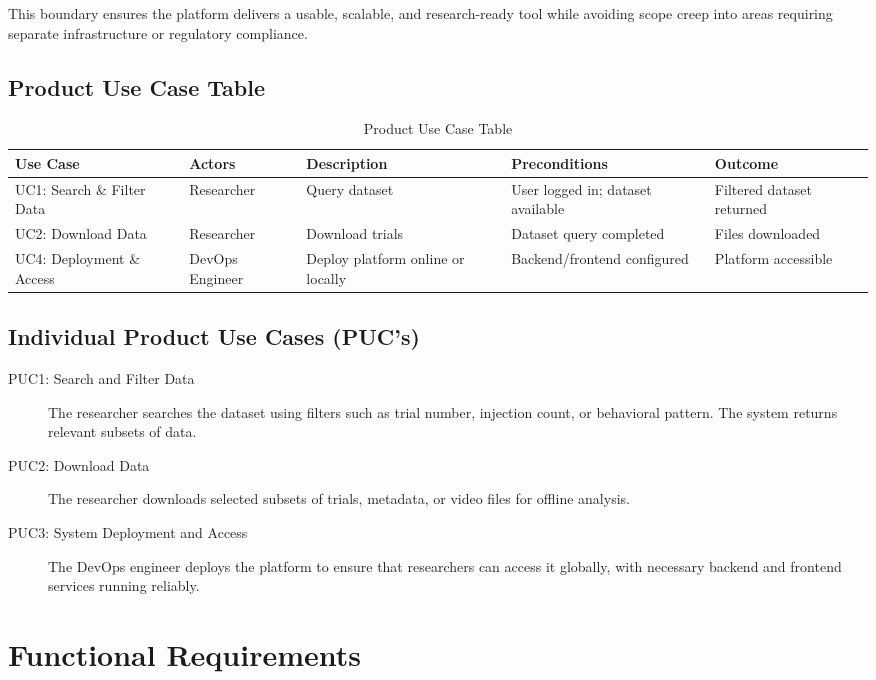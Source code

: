 \documentclass[12pt]{article}
\begin{document}
This boundary ensures the platform delivers a usable, scalable, and research-ready tool while avoiding scope creep into areas requiring separate infrastructure or regulatory compliance.

\subsection{Product Use Case Table}

\begin{table}[h!]
\centering
\begin{tabular}{|p{2.5cm}|p{2cm}|p{3.0cm}|p{3.0cm}|p{2.5cm}|}
\hline
\textbf{Use Case} & \textbf{Actors} & \textbf{Description} & \textbf{Preconditions} & \textbf{Outcome} \\
\hline
UC1: Search \& Filter Data & Researcher & Query dataset & User logged in; dataset available & Filtered dataset returned \\
\hline
UC2: Download Data & Researcher & Download trials & Dataset query completed & Files downloaded \\
\hline
UC4: Deployment \& Access & DevOps Engineer & Deploy platform online or locally & Backend/frontend configured & Platform accessible \\
\hline
\end{tabular}
\caption{Product Use Case Table}
\end{table}

\subsection{Individual Product Use Cases (PUC’s)}

\begin{description}
\item[PUC1: Search and Filter Data] The researcher searches the dataset using filters such as trial number, injection count, or behavioral pattern. The system returns relevant subsets of data.
\item[PUC2: Download Data] The researcher downloads selected subsets of trials, metadata, or video files for offline analysis.
\item[PUC3: System Deployment and Access] The DevOps engineer deploys the platform to ensure that researchers can access it globally, with necessary backend and frontend services running reliably.
\end{description}

\section{Functional Requirements}
\end{document}
